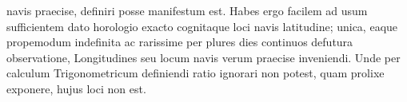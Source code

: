 navis\protect{} praecise, definiri posse manifestum est. \pend
\pstart Habes ergo facilem  ad usum sufficientem dato horologio\protect{} exacto cognitaque loci navis\protect{} latitudine\protect{}; unica, eaque propemodum indefinita ac rarissime per plures dies continuos defutura observatione, Longitudines\protect{} seu locum navis\protect{} verum praecise inveniendi. Unde  per calculum Trigonometricum definiendi ratio ignorari non potest, quam prolixe exponere, hujus loci non est.\pend \pstart 